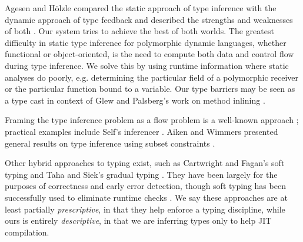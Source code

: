 Agesen and H\"olzle compared the static approach of type inference with the
dynamic approach of type feedback and described the strengths and weaknesses
of both \cite{Agesen95}. Our system tries to achieve the best of both
worlds. The greatest difficulty in static type inference for polymorphic
dynamic languages, whether functional or object-oriented, is the need to
compute both data and control flow during type inference. We solve this by
using runtime information where static analyses do poorly,
e.g. determining the particular field of a polymorphic receiver or the
particular function bound to a variable. Our type barriers may be seen as a
type cast in context of Glew and
Palsberg's work on method inlining \cite{Glew02}.

Framing the type inference problem as a flow problem is a well-known approach
\cite{Oxhoj92, Palsberg91}; practical examples include Self's inferencer
\cite{Agesen93TI}.
Aiken and Wimmers presented general results on
type inference using subset constraints \cite{Aiken93}.


Other hybrid approaches to typing exist, such as Cartwright and Fagan's soft
typing and Taha and Siek's gradual typing \cite{Cartwright91, Siek07}. They
have been largely for the purposes of correctness and early error
detection, though soft typing has been successfully used to eliminate runtime checks \cite{Wright97}.
We say these approaches are at least partially \emph{prescriptive}, in that they
help enforce a typing discipline, while ours is entirely \emph{descriptive}, in that
we are inferring types only to help JIT compilation.



